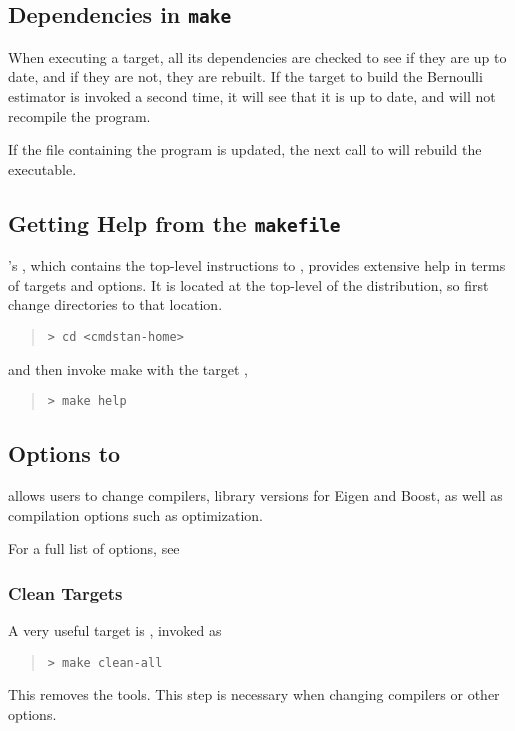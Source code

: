 \subsection{Dependencies in {\tt\bfseries make}}

When executing a  target, all its dependencies are checked
to see if they are up to date, and if they are not, they are rebuilt.
If the  target to build the Bernoulli estimator is invoked
a second time, it will see that it is up to date, and will not
recompile the program.

If the file containing the \Stan program is updated, the next call to
 will rebuild the \CmdStan executable.



\subsection{Getting Help from the {\tt makefile}}

\CmdStan's , which contains the top-level instructions to
, provides extensive help in terms of targets and options.
It is located at the top-level of the distribution, so first change
directories to that location.
%
\begin{quote}
\begin{Verbatim}[fontshape=sl]
> cd <cmdstan-home>
\end{Verbatim}
\end{quote} 
and then invoke make with the target ,

\begin{quote}
\begin{Verbatim}[fontshape=sl]
> make help
\end{Verbatim}
\end{quote}


\subsection{Options to }

\CmdStan allows users to change compilers, library versions for Eigen
and Boost, as well as compilation options such as optimization.

For a full list of options, see 



\subsubsection{Clean Targets}

A very useful target is , invoked as
%
\begin{quote}
\begin{Verbatim}[fontshape=sl]
> make clean-all
\end{Verbatim}
\end{quote}
%
This removes the \CmdStan tools. This step is necessary when changing
compilers or other  options.
